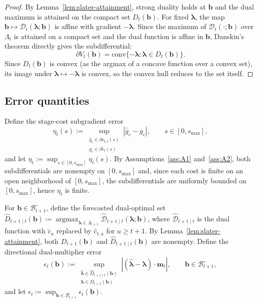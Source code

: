 \documentclass[11pt]{article}
\newcommand{\1}{\mathbf{1}}
\newcommand{\eqdef}{\coloneqq}
\newcommand{\bcal}{\mathcal{B}}
\newcommand{\argmax}{\operatorname*{argmax}}
\newcommand{\subdiff}{\partial}
\begin{document}
\begin{proof}
  By Lemma~\ref{lem:slater-attainment}, strong duality holds at $\mathbf{b}$ and the dual maximum is attained on the compact set $D_t(\mathbf{b})$.
  For fixed $\boldsymbol{\lambda}$, the map
  $\mathbf{b} \mapsto \mathcal{D}_t(\boldsymbol{\lambda};\mathbf{b})$
  is affine with gradient $-\boldsymbol{\lambda}$.
  Since the maximum of $\mathcal{D}_t(\cdot;\mathbf{b})$ over $\Lambda_t$ is attained on a compact set and the dual function is affine in $\mathbf{b}$, Danskin's theorem directly gives the subdifferential:
  \begin{equation*}
    \subdiff V_t(\mathbf{b})
    = \mathrm{conv}\{-\boldsymbol{\lambda} : \boldsymbol{\lambda} \in D_t(\mathbf{b})\}.
  \end{equation*}
  Since $D_t(\mathbf{b})$ is convex (as the argmax of a concave function over a convex set), its image under $\boldsymbol{\lambda}\mapsto -\boldsymbol{\lambda}$ is convex, so the convex hull reduces to the set itself. \qedhere
\end{proof}

\subsection{Error quantities}
\label{subsec:errors}

Define the stage-cost subgradient error
\begin{equation}
  \label{eq:eta-t}
  \eta_t(s)
  := \sup_{\substack{\hat{g}_c \in \subdiff \hat{c}_{t,t}(s) \\ g_c \in \subdiff \tilde{c}_t(s)}}
  |\hat{g}_c - g_c|,
  \qquad s \in [0,s_{\max}],
\end{equation}
and let $\eta_t := \sup_{s \in [0,s_{\max}]} \eta_t(s)$.
By Assumptions~\ref{ass:A1} and~\ref{ass:A2}, both subdifferentials are nonempty on $[0,s_{\max}]$ and, since each cost is finite on an open neighborhood of $[0,s_{\max}]$, the subdifferentials are uniformly bounded on $[0,s_{\max}]$, hence $\eta_t$ is finite.

For $\mathbf{b} \in \bcal_{t+1}^\circ$, define the forecasted dual-optimal set
$\hat{D}_{t+1 \mid t}(\mathbf{b}) \eqdef \argmax_{\boldsymbol{\lambda} \in \Lambda_{t+1}} \hat{\mathcal{D}}_{t+1 \mid t}(\boldsymbol{\lambda};\mathbf{b})$,
where $\hat{\mathcal{D}}_{t+1 \mid t}$ is the dual function with $\tilde{c}_u$ replaced by $\hat{c}_{t,u}$ for $u \geq t+1$.
By Lemma~\ref{lem:slater-attainment}, both $D_{t+1}(\mathbf{b})$ and $\hat{D}_{t+1 \mid t}(\mathbf{b})$ are nonempty.
Define the directional dual-multiplier error
\begin{equation}
  \label{eq:epsilon-t}
  \epsilon_t(\mathbf{b})
  := \sup_{\substack{\hat{\boldsymbol{\lambda}} \in \hat{D}_{t+1 \mid t}(\mathbf{b})\\ \boldsymbol{\lambda} \in D_{t+1}(\mathbf{b})}}
  \left|(\hat{\boldsymbol{\lambda}}-\boldsymbol{\lambda})\cdot\mathbf{m}_t\right|,
  \qquad \mathbf{b} \in \bcal_{t+1}^\circ,
\end{equation}
and let $\epsilon_t \eqdef \sup_{\mathbf{b} \in \bcal_{t+1}^\circ} \epsilon_t(\mathbf{b})$.
\end{document}
